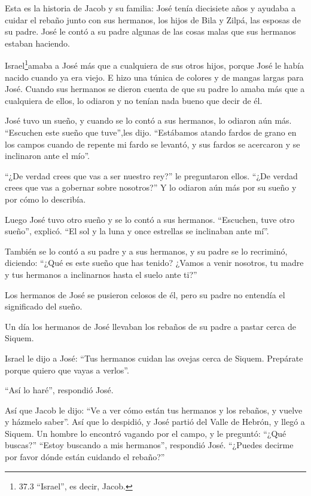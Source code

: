  Esta es la historia de Jacob y su familia: José tenía
diecisiete años y ayudaba a cuidar el rebaño junto con sus hermanos, los
hijos de Bila y Zilpá, las esposas de su padre. José le contó a su padre
algunas de las cosas malas que sus hermanos estaban haciendo.

 Israel\footnote{37.3 ``Israel'', es decir, Jacob.}amaba a
José más que a cualquiera de sus otros hijos, porque José le había
nacido cuando ya era viejo. E hizo una túnica de colores y de mangas
largas para José.  Cuando sus hermanos se dieron cuenta de
que su padre lo amaba más que a cualquiera de ellos, lo odiaron y no
tenían nada bueno que decir de él.

 José tuvo un sueño, y cuando se lo contó a sus hermanos, lo
odiaron aún más.  ``Escuchen este sueño que tuve'',les dijo.
 ``Estábamos atando fardos de grano en los campos cuando de
repente mi fardo se levantó, y sus fardos se acercaron y se inclinaron
ante el mío''.

 ``¿De verdad crees que vas a ser nuestro rey?'' le
preguntaron ellos. ``¿De verdad crees que vas a gobernar sobre
nosotros?'' Y lo odiaron aún más por su sueño y por cómo lo describía.

 Luego José tuvo otro sueño y se lo contó a sus hermanos.
``Escuchen, tuve otro sueño'', explicó. ``El sol y la luna y once
estrellas se inclinaban ante mí''.

 También se lo contó a su padre y a sus hermanos, y su
padre se lo recriminó, diciendo: ``¿Qué es este sueño que has tenido?
¿Vamos a venir nosotros, tu madre y tus hermanos a inclinarnos hasta el
suelo ante ti?''

 Los hermanos de José se pusieron celosos de él, pero su
padre no entendía el significado del sueño.

 Un día los hermanos de José llevaban los rebaños de su
padre a pastar cerca de Siquem.

 Israel le dijo a José: ``Tus hermanos cuidan las ovejas
cerca de Siquem. Prepárate porque quiero que vayas a verlos''.

``Así lo haré'', respondió José.

 Así que Jacob le dijo: ``Ve a ver cómo están tus hermanos
y los rebaños, y vuelve y házmelo saber''. Así que lo despidió, y José
partió del Valle de Hebrón,  y llegó a Siquem. Un hombre lo
encontró vagando por el campo, y le preguntó: ``¿Qué buscas?''
 ``Estoy buscando a mis hermanos'', respondió José.
``¿Puedes decirme por favor dónde están cuidando el rebaño?''

